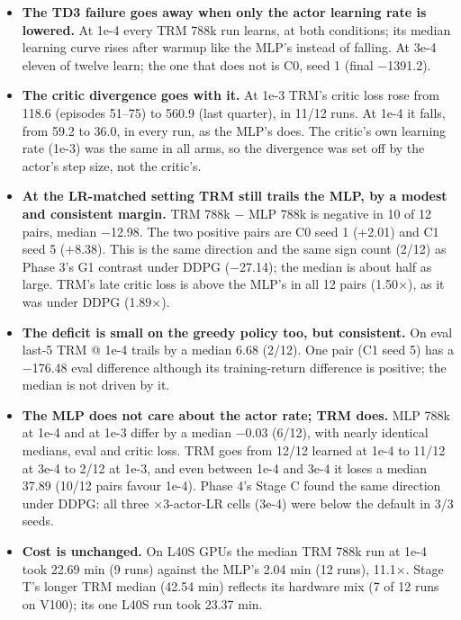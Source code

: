 \documentclass[11pt]{article}
\begin{document}
\begin{itemize}
\item \textbf{The TD3 failure goes away when only the actor learning rate is lowered.} At 1e-4 every TRM 788k run learns, at both conditions; its median learning curve rises after warmup like the MLP's instead of falling. At 3e-4 eleven of twelve learn; the one that does not is C0, seed 1 (final $-$1391.2).
\item \textbf{The critic divergence goes with it.} At 1e-3 TRM's critic loss rose from 118.6 (episodes 51--75) to 560.9 (last quarter), in 11/12 runs. At 1e-4 it falls, from 59.2 to 36.0, in every run, as the MLP's does. The critic's own learning rate (1e-3) was the same in all arms, so the divergence was set off by the actor's step size, not the critic's.
\item \textbf{At the LR-matched setting TRM still trails the MLP, by a modest and consistent margin.} TRM 788k $-$ MLP 788k is negative in 10 of 12 pairs, median $-$12.98. The two positive pairs are C0 seed 1 (+2.01) and C1 seed 5 (+8.38). This is the same direction and the same sign count (2/12) as Phase 3's G1 contrast under DDPG ($-$27.14); the median is about half as large. TRM's late critic loss is above the MLP's in all 12 pairs (1.50$\times$), as it was under DDPG (1.89$\times$).
\item \textbf{The deficit is small on the greedy policy too, but consistent.} On eval last-5 TRM @ 1e-4 trails by a median 6.68 (2/12). One pair (C1 seed 5) has a $-$176.48 eval difference although its training-return difference is positive; the median is not driven by it.
\item \textbf{The MLP does not care about the actor rate; TRM does.} MLP 788k at 1e-4 and at 1e-3 differ by a median $-$0.03 (6/12), with nearly identical medians, eval and critic loss. TRM goes from 12/12 learned at 1e-4 to 11/12 at 3e-4 to 2/12 at 1e-3, and even between 1e-4 and 3e-4 it loses a median 37.89 (10/12 pairs favour 1e-4). Phase 4's Stage C found the same direction under DDPG: all three $\times$3-actor-LR cells (3e-4) were below the default in 3/3 seeds.
\item \textbf{Cost is unchanged.} On L40S GPUs the median TRM 788k run at 1e-4 took 22.69 min (9 runs) against the MLP's 2.04 min (12 runs), 11.1$\times$. Stage T's longer TRM median (42.54 min) reflects its hardware mix (7 of 12 runs on V100); its one L40S run took 23.37 min.
\end{itemize}
\end{document}
